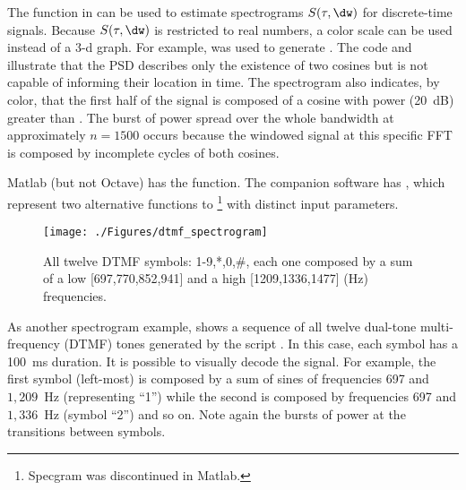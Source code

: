The  function in {\matlab} can be used to estimate spectrograms $S(\tau,\dw)$ for discrete-time signals. Because $S(\tau,\dw)$ is restricted to real numbers, a color scale can be used instead of a 3-d graph.
For example,  was used to generate .
The code and  illustrate that the PSD describes only the existence of two cosines but is not capable of informing their location in time. The spectrogram also indicates, by color, that the first half of the signal is composed of a cosine  with power (20~dB) greater than . The burst of power spread over the whole bandwidth at approximately $n=1500$ occurs because the windowed signal at this specific FFT is composed by incomplete cycles of both cosines.

Matlab (but not Octave) has the  function. The companion software has , which represent two alternative functions to \footnote{Specgram was discontinued in Matlab.} with distinct input parameters.


\begin{figure}[htbp]
\centering
\texttt{[image: ./Figures/dtmf\_spectrogram]}
\caption{All twelve DTMF symbols: 1-9,*,0,\#, each one composed by a sum of a low [697,770,852,941] and a high [1209,1336,1477] (Hz) frequencies.\label{fig:dtmf_spectrogram}}
\end{figure}

As another spectrogram example,  shows a sequence of all twelve dual-tone multi-frequency (DTMF) tones generated by the script . In this case, each symbol has a 100~ms duration. It is possible to visually decode the signal. For example, the first symbol (left-most) is composed by a sum of sines of frequencies 697 and $1,209$~Hz (representing ``1'') while the second is composed by frequencies 697 and $1,336$~Hz (symbol ``2'') and so on. Note again the bursts of power at the transitions between symbols.

